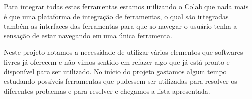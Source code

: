 Para integrar todas estas ferramentas estamos utilizando o Colab que nada mais é que uma plataforma de integração de ferramentas, o qual são integradas também as interfaces das ferramentas para que ao navegar o usuário tenha a sensação de estar navegando em uma única ferramenta.

Neste projeto notamos a necessidade de utilizar vários elementos que softwares livres já oferecem e não vimos sentido em refazer algo que já está pronto e disponível para ser utilizado. No início do projeto gastamos algum tempo estudando possíveis ferramentas que pudessem ser utilizadas para resolver os diferentes problemas e para resolver e chegamos a lista apresentada.  
